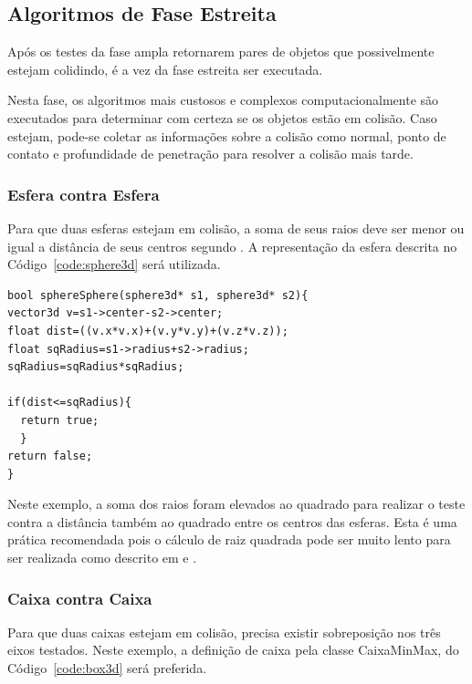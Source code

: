 \subsection{Algoritmos de Fase Estreita}

Após  os testes da fase ampla retornarem pares de objetos que possivelmente
estejam colidindo, é a vez da fase estreita ser executada.

Nesta fase, os algoritmos mais custosos e complexos computacionalmente são
executados para determinar com certeza se os objetos estão em colisão.
Caso estejam, pode-se coletar as informações sobre a colisão como normal, ponto
de contato e profundidade de penetração para resolver a colisão mais tarde.

\subsubsection{Esfera contra Esfera}

Para que duas esferas estejam em colisão, a soma de seus raios deve ser menor
ou igual a distância de seus centros segundo .
A representação da esfera descrita no Código~\ref{code:sphere3d} será utilizada.

\begin{lstlisting}[frame=single,caption=Colisão entre esferas\label{code:collisionSphereSphere}]
bool sphereSphere(sphere3d* s1, sphere3d* s2){
vector3d v=s1->center-s2->center;
float dist=((v.x*v.x)+(v.y*v.y)+(v.z*v.z));
float sqRadius=s1->radius+s2->radius;
sqRadius=sqRadius*sqRadius;

if(dist<=sqRadius){
  return true;
  }
return false;
}
\end{lstlisting}

Neste exemplo, a soma dos raios foram elevados ao quadrado para realizar o
teste contra a distância também ao quadrado entre os centros das esferas.
Esta é uma prática recomendada pois o cálculo de raiz quadrada pode ser muito
lento para ser realizada como descrito em  e .

\subsubsection{Caixa contra Caixa}

Para que duas caixas estejam em colisão, precisa existir sobreposição nos três
eixos testados.
Neste exemplo, a definição de caixa pela classe CaixaMinMax, do Código~\ref{code:box3d} será preferida.

